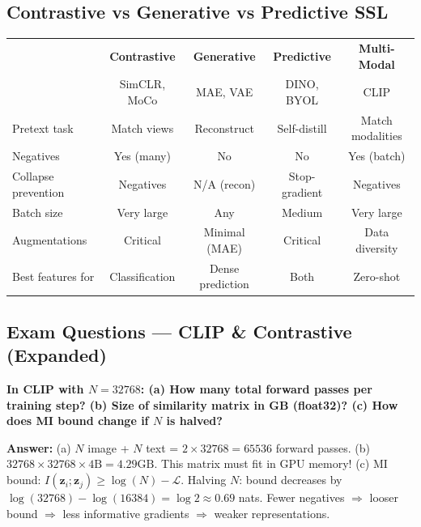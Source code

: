 \subsection{Contrastive vs Generative vs Predictive SSL}
\begin{center}\small
\begin{tabular}{lcccc}\toprule
& \textbf{Contrastive} & \textbf{Generative} & \textbf{Predictive} & \textbf{Multi-Modal} \\
& SimCLR, MoCo & MAE, VAE & DINO, BYOL & CLIP \\\midrule
Pretext task & Match views & Reconstruct & Self-distill & Match modalities \\
Negatives & Yes (many) & No & No & Yes (batch) \\
Collapse prevention & Negatives & N/A (recon) & Stop-gradient & Negatives \\
Batch size & Very large & Any & Medium & Very large \\
Augmentations & Critical & Minimal (MAE) & Critical & Data diversity \\
Best features for & Classification & Dense prediction & Both & Zero-shot \\
\bottomrule
\end{tabular}
\end{center}

\subsection{Exam Questions — CLIP \& Contrastive (Expanded)}

\begin{examq}
\textbf{In CLIP with $N{=}32768$: (a) How many total forward passes per training step? (b) Size of similarity matrix in GB (float32)? (c) How does MI bound change if $N$ is halved?}

\textbf{Answer:} (a) $N$ image + $N$ text = $2 \times 32768 = 65536$ forward passes. (b) $32768 \times 32768 \times 4\text{B} = 4.29\text{GB}$. This matrix must fit in GPU memory! (c) MI bound: $I(\mathbf{z}_i;\mathbf{z}_j) \geq \log(N) - \mathcal{L}$. Halving $N$: bound decreases by $\log(32768)-\log(16384) = \log 2 \approx 0.69$ nats. Fewer negatives $\Rightarrow$ looser bound $\Rightarrow$ less informative gradients $\Rightarrow$ weaker representations.
\end{examq}

